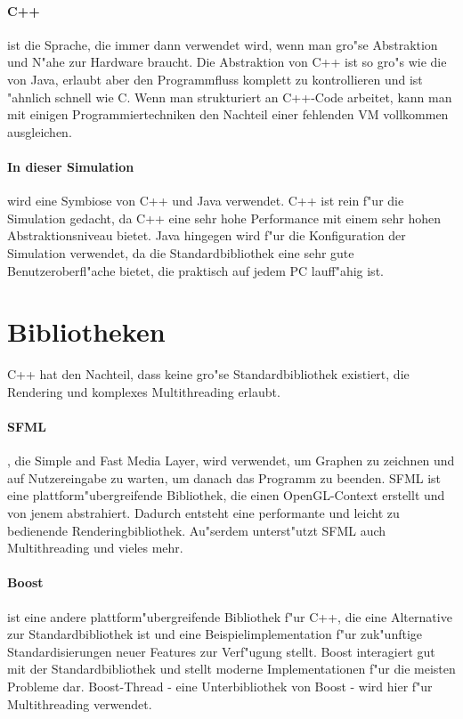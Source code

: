 \documentclass[14pt, a4paper]{report}
\begin{document}
\paragraph{C++} ist die Sprache, die immer dann verwendet wird, wenn man gro"se 
Abstraktion und N"ahe zur Hardware braucht. Die Abstraktion von C++ ist so gro"s wie die
von Java, erlaubt aber den Programmfluss komplett zu kontrollieren
und ist "ahnlich schnell
wie C. Wenn man strukturiert an C++-Code arbeitet, kann man mit einigen 
Programmiertechniken  
den Nachteil einer fehlenden VM vollkommen ausgleichen.

\paragraph{In dieser Simulation} wird eine Symbiose von C++ und Java verwendet. C++ ist rein f"ur 
die Simulation gedacht, da C++ eine sehr hohe Performance mit einem sehr hohen 
Abstraktionsniveau bietet. Java hingegen wird f"ur die Konfiguration der 
Simulation verwendet, da die
Standardbibliothek eine sehr gute Benutzeroberfl"ache bietet, die praktisch auf jedem
PC lauff"ahig ist.

\section{Bibliotheken}
C++ hat den Nachteil, dass keine gro"se Standardbibliothek existiert, 
die Rendering und komplexes Multithreading erlaubt.

\paragraph{SFML}, die Simple and Fast Media Layer, wird verwendet, um Graphen zu 
zeichnen und auf Nutzereingabe zu warten, um danach das Programm zu beenden. SFML
ist eine plattform"ubergreifende Bibliothek, die einen OpenGL-Context erstellt und von
jenem abstrahiert. Dadurch entsteht eine performante und leicht zu bedienende 
Renderingbibliothek. Au"serdem unterst"utzt SFML auch Multithreading und vieles mehr.

\paragraph{Boost} ist eine andere plattform"ubergreifende Bibliothek f"ur C++, die eine
Alternative zur Standardbibliothek ist und eine Beispielimplementation f"ur zuk"unftige 
Standardisierungen neuer Features zur Verf"ugung stellt. Boost interagiert gut mit der 
Standardbibliothek und stellt moderne Implementationen f"ur
die meisten Probleme dar. Boost-Thread - eine Unterbibliothek von Boost -
wird hier f"ur Multithreading verwendet.
\end{document}
